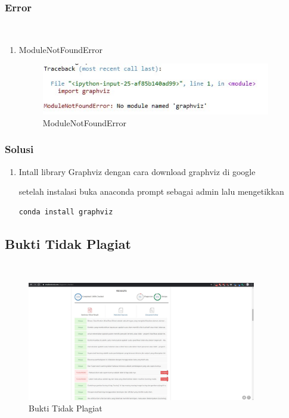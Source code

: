 \subsubsection{Error}
\hfill\\
\begin{enumerate}
\item ModuleNotFoundError

\begin{figure}[H]
\centerline{\includegraphics[width=10cm]{figures/1174074/2/error1.jpg}}
\caption{ModuleNotFoundError}
\label{labelgambar}
\end{figure}
\end{enumerate}

\subsubsection{Solusi}
\begin{enumerate}
\item Intall library Graphviz dengan cara download graphviz di google

setelah instalasi buka anaconda prompt sebagai admin lalu mengetikkan
\begin{lstlisting}
conda install graphviz
\end{lstlisting} 
\end{enumerate}

\subsection{Bukti Tidak Plagiat}
\hfill\\
\begin{figure}[H]
\centerline{\includegraphics[width=10cm]{figures/1174074/2/plagiat.jpg}}
\caption{Bukti Tidak Plagiat}
\label{labelgambar}
\end{figure}
